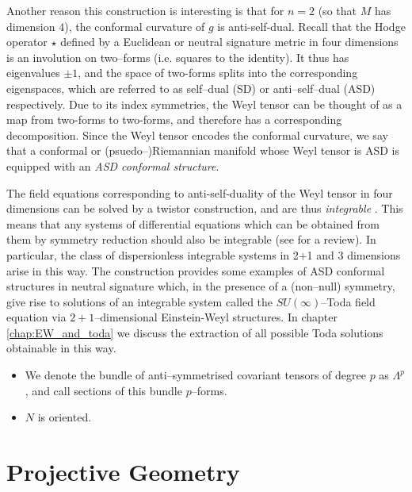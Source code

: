 Another reason this construction is interesting is that for $n=2$ (so that $M$ has dimension $4$), the conformal
curvature of $g$ is anti-self-dual. Recall that the Hodge operator
$\star$ defined by a Euclidean or neutral signature metric in four
dimensions is an involution on two--forms (i.e. squares to the identity).
It thus has eigenvalues $\pm1$, and the space of two-forms splits
into the corresponding eigenspaces, which are referred to as self--dual
(SD) or anti--self--dual (ASD) respectively. Due to its index symmetries,
the Weyl tensor can be thought of as a map from two-forms to two-forms,
and therefore has a corresponding decomposition. Since the Weyl tensor
encodes the conformal curvature, we say that a conformal or (psuedo--)Riemannian
manifold whose Weyl tensor is ASD is equipped with an \textit{ASD
conformal structure}.

The field equations corresponding to anti-self-duality of the Weyl
tensor in four dimensions can be solved by a twistor construction,
and are thus \textit{integrable} \cite{ward}. This means that any systems of differential
equations which can be obtained from them by symmetry reduction should
also be integrable (see \cite{MW} for a review). In particular, the class of dispersionless
integrable systems in 2+1 and 3 dimensions arise in this way. The
construction \cite{DM} provides some examples of
ASD conformal structures in neutral signature which, in the presence
of a (non--null) symmetry, give rise to solutions of an integrable
system called the $SU(\infty)$--Toda field equation via $2+1$--dimensional
Einstein-Weyl structures. In chapter \ref{chap:EW_and_toda} we discuss the extraction
of all possible Toda solutions obtainable in this way.

\begin{itemize}
\item We denote the bundle of anti--symmetrised covariant tensors of degree $p$ as $\Lambda^p$, and call sections of this bundle $p$--forms.
\item $N$ is oriented.
\end{itemize}

\section{Projective Geometry}\label{sec:projgeom}

